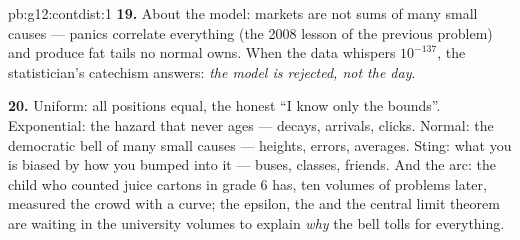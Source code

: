 \begin{solution}{pb:g12:contdist:1}
\textbf{19.} About the model: markets are not sums of many
\emph{} small causes --- panics correlate
everything (the 2008 lesson of the previous problem) and
produce fat tails no normal  owns. When the data
whispers $10^{-137}$, the statistician's catechism answers:
\emph{the model is rejected, not the day}.

\textbf{20.} Uniform: all positions equal, the honest ``I
know only the bounds''. Exponential: the hazard that never
ages --- decays, arrivals, clicks. Normal: the democratic
bell of many small  causes --- heights, errors,
averages. Sting: what you  is biased by how you bumped
into it --- buses, classes, friends. And the arc: the child
who counted juice cartons in grade 6 has, ten volumes of
problems later, measured the crowd with a curve; the epsilon,
the  and the central limit theorem are waiting in the
university volumes to explain \emph{why} the bell tolls for
everything.
\end{solution}
